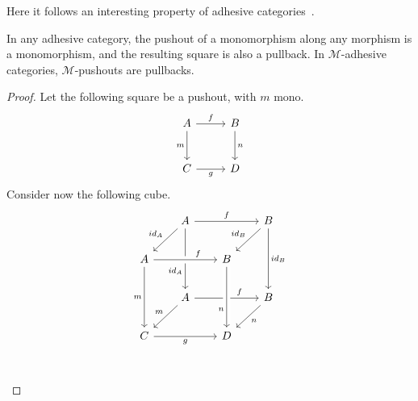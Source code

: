 Here it follows an interesting property of adhesive categories~\cite{lack2011embeddingtheoremadhesivecategories}.

\begin{prop}\label{prop:monos_are_preserved_by_pullbacks_in_adh_cats}
    In any adhesive category, the pushout of a monomorphism along any morphism is a monomorphism, and the resulting square is also a pullback. %
	In $\mathcal{M}$-adhesive categories, $\mathcal{M}$-pushouts are pullbacks.
\end{prop}

\begin{proof}
	Let the following square be a pushout, with $m$ mono.
	\[\begin{tikzcd}[row sep = 26, column sep = 26]
		A \ar[r, "f"] \ar[d, "m"swap] & B \ar[d, "n"] \\
		C \ar[r, "g"swap] & D
	\end{tikzcd}\]
	Consider now the following cube.
	\[\begin{tikzcd}[row sep = 20, column sep = 20]
	& A && B \\
	A && B \\
	& A && B \\
	C && D \\
	& {}
	\arrow["f", from=1-2, to=1-4]
	\arrow["{id_A}"', from=1-2, to=2-1]
	\arrow["{id_A}"'{pos=0.7}, from=1-2, to=3-2]
	\arrow["{id_B}"', from=1-4, to=2-3]
	\arrow["{id_B}", from=1-4, to=3-4]
	\arrow["m"', from=2-1, to=4-1]
	\arrow["f"{pos=0.7}, from=3-2, to=3-4]
	\arrow["m"', from=3-2, to=4-1]
	\arrow["n", from=3-4, to=4-3]
	\arrow["g"', from=4-1, to=4-3]
	\arrow["f"{pos=0.7}, from=2-1, to=2-3, crossing over]
	\arrow["n"'{pos=0.7}, from=2-3, to=4-3, crossing over]
	\end{tikzcd}\]


\end{proof}

